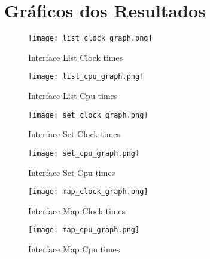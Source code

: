 \section{Gráficos dos Resultados}\label{sec:graphics}
	\begin{figure}[ht]
		\centering
		\texttt{[image: list\_clock\_graph.png]}
		\caption{Interface List Clock times}
		\label{fig:list_clock}
	\end{figure}

	\begin{figure}[ht]
		\centering
		\texttt{[image: list\_cpu\_graph.png]}
		\caption{Interface List Cpu times}
		\label{fig:list_cpu}
	\end{figure}

	\begin{figure}[ht]
		\centering
		\texttt{[image: set\_clock\_graph.png]}
		\caption{Interface Set Clock times}
		\label{fig:set_clock}
	\end{figure}

	\begin{figure}[ht]
		\centering
		\texttt{[image: set\_cpu\_graph.png]}
		\caption{Interface Set Cpu times}
		\label{fig:set_cpu}
	\end{figure}

	\begin{figure}[ht]
		\centering
		\texttt{[image: map\_clock\_graph.png]}
		\caption{Interface Map Clock times}
		\label{fig:map_clock}
	\end{figure}

	\begin{figure}[ht]
		\centering
		\texttt{[image: map\_cpu\_graph.png]}
		\caption{Interface Map Cpu times}
		\label{fig:map_cpu}
	\end{figure}

